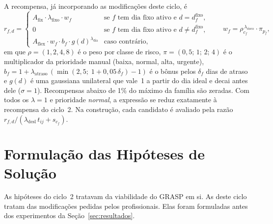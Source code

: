 \documentclass[11pt,a4paper]{article}
\begin{document}
A recompensa, já incorporando as modificações deste ciclo, é
\begin{equation}
r_{f,d} =
\begin{cases}
A_{\text{fix}} \cdot \lambda_{\text{fixo}} \cdot w_f & \text{se } f \text{ tem dia fixo ativo e } d = d^{\text{fixo}}_f,\\
0 & \text{se } f \text{ tem dia fixo ativo e } d \neq d^{\text{fixo}}_f,\\
A_{\text{flex}} \cdot w_f \cdot b_f \cdot g(d)^{\lambda_{\text{dia}}} & \text{caso contrário,}
\end{cases}
\qquad
w_f = \rho_{c_f}^{\,\lambda_{\text{risco}}} \cdot \pi_{p_f},
\label{eq:recompensa}
\end{equation}
em que $\rho = (1,2,4,8)$ é o peso por classe de risco, $\pi = (0{,}5;\,1;\,2;\,4)$ é o multiplicador da prioridade manual (baixa, normal, alta, urgente), $b_f = 1 + \lambda_{\text{atraso}}\,(\min(2{,}5;\; 1 + 0{,}05\,\delta_f) - 1)$ é o bônus pelos $\delta_f$ dias de atraso e $g(d)$ é uma gaussiana unilateral que vale~1 a partir do dia ideal e decai antes dele ($\sigma = 1$). Recompensas abaixo de 1\% do máximo da família são zeradas. Com todos os $\lambda = 1$ e prioridade \emph{normal}, a expressão se reduz exatamente à recompensa do ciclo~2. Na construção, cada candidato é avaliado pela razão $r_{f,d} / (\lambda_{\text{desl}}\, t_{ij} + s_{c_f})$.

\section{Formulação das Hipóteses de Solução}

As hipóteses do ciclo~2 tratavam da viabilidade do GRASP em si. As deste ciclo tratam das modificações pedidas pelos profissionais. Elas foram formuladas antes dos experimentos da Seção~\ref{sec:resultados}.
\end{document}
